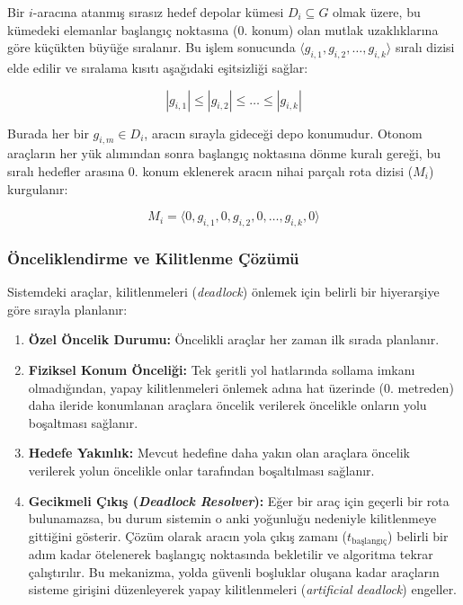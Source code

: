 Bir $i$-aracına atanmış sırasız hedef depolar kümesi $D_i \subseteq G$ olmak üzere, bu kümedeki elemanlar başlangıç noktasına (0. konum) olan mutlak uzaklıklarına göre küçükten büyüğe sıralanır. Bu işlem sonucunda $\langle g_{i,1}, g_{i,2}, \dots, g_{i,k} \rangle$ sıralı dizisi elde edilir ve sıralama kısıtı aşağıdaki eşitsizliği sağlar:

\begin{equation}
    |g_{i,1}| \le |g_{i,2}| \le \dots \le |g_{i,k}|
\end{equation}

Burada her bir $g_{i,m} \in D_i$, aracın sırayla gideceği depo konumudur. Otonom araçların her yük alımından sonra başlangıç noktasına dönme kuralı gereği, bu sıralı hedefler arasına 0. konum eklenerek aracın nihai parçalı rota dizisi ($M_i$) kurgulanır:

\begin{equation}
    M_i = \langle 0, g_{i,1}, 0, g_{i,2}, 0, \dots, g_{i,k}, 0 \rangle
\end{equation}


\subsubsection{Önceliklendirme ve Kilitlenme Çözümü} \label{sec:önceliklendirme-ve-kilitlenme-çözümü}

Sistemdeki araçlar, kilitlenmeleri (\textit{deadlock}) önlemek için belirli bir hiyerarşiye göre sırayla planlanır:

\begin{enumerate}
    \item \textbf{Özel Öncelik Durumu:} Öncelikli araçlar her zaman ilk sırada planlanır.
    \item \textbf{Fiziksel Konum Önceliği:} Tek şeritli yol hatlarında sollama imkanı olmadığından, yapay kilitlenmeleri önlemek adına hat üzerinde (0. metreden) daha ileride konumlanan araçlara öncelik verilerek öncelikle onların yolu boşaltması sağlanır.
    \item \textbf{Hedefe Yakınlık:} Mevcut hedefine daha yakın olan araçlara öncelik verilerek yolun öncelikle onlar tarafından boşaltılması sağlanır.
    \item \textbf{Gecikmeli Çıkış (\textit{Deadlock Resolver}):} Eğer bir araç için geçerli bir rota bulunamazsa, bu durum sistemin o anki yoğunluğu nedeniyle kilitlenmeye gittiğini gösterir. Çözüm olarak aracın yola çıkış zamanı ($t_{\text{başlangıç}}$) belirli bir adım kadar ötelenerek başlangıç noktasında bekletilir ve algoritma tekrar çalıştırılır. Bu mekanizma, yolda güvenli boşluklar oluşana kadar araçların sisteme girişini düzenleyerek yapay kilitlenmeleri (\textit{artificial deadlock}) engeller.
\end{enumerate}


